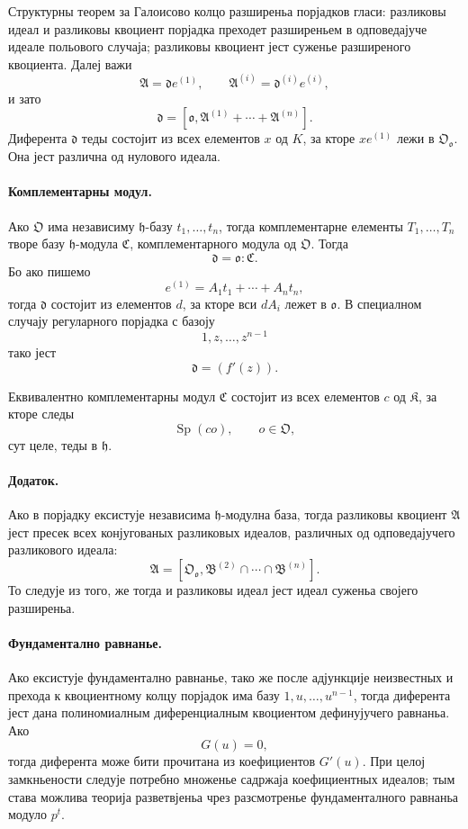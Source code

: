 ﻿\documentclass[11pt]{article}
\begin{document}
Структурны теорем за Галоисово колцо разширеньа порјадков гласи: разликовы идеал и разликовы квоциент порјадка преходет разширеньем в одповедајуче идеале польового случаја; разликовы квоциент јест суженье разширеного квоциента. Далеј важи
\[
        \mathfrak A=\mathfrak d e^{(1)},
        \qquad
        \mathfrak A^{(i)}=\mathfrak d^{(i)}e^{(i)},
\]
и зато
\[
        \mathfrak d=[\mathfrak o,\mathfrak A^{(1)}+
        \cdots+\mathfrak A^{(n)}].
\]
Диферента \(\mathfrak d\) теды состојит из всех елементов \(x\) од \(K\), за кторе \(xe^{(1)}\) лежи в \(\mathfrak O_{\mathfrak o}\). Она јест различна од нулового идеала.

\paragraph{Комплементарны модул.}
Ако \(\mathfrak O\) има независиму \(\mathfrak h\)-базу \(t_1,\ldots,t_n\), тогда комплементарне елементы \(T_1,\ldots,T_n\) творе базу \(\mathfrak h\)-модула \(\mathfrak C\), комплементарного модула од \(\mathfrak O\). Тогда
\[
        \mathfrak d=\mathfrak o:\mathfrak C.
\]
Бо ако пишемо
\[
        e^{(1)}=A_1t_1+
        \cdots+A_nt_n,
\]
тогда \(\mathfrak d\) состојит из елементов \(d\), за кторе вси \(dA_i\) лежет в \(\mathfrak o\). В специалном случају регуларного порјадка с базоју
\[
        1,z,\ldots,z^{n-1}
\]
тако јест
\[
        \mathfrak d=(f'(z)).
\]

Еквивалентно комплементарны модул \(\mathfrak C\) состојит из всех елементов \(c\) од \(\mathfrak K\), за кторе следы
\[
        \operatorname{Sp}(co),\qquad o\in\mathfrak O,
\]
сут целе, теды в \(\mathfrak h\).

\paragraph{Додаток.}
Ако в порјадку ексистује независима \(\mathfrak h\)-модулна база, тогда разликовы квоциент \(\mathfrak A\) јест пресек всех конјугованых разликовых идеалов, различных од одповедајучего разликового идеала:
\[
        \mathfrak A=[\mathfrak O_{\mathfrak o},
        \mathfrak B^{(2)}\cap\cdots\cap\mathfrak B^{(n)}].
\]
То следује из того, же тогда и разликовы идеал јест идеал суженьа својего разширеньа.

\paragraph{Фундаментално равнанье.}
Ако ексистује фундаментално равнанье, тако же после адјункције неизвестных и прехода к квоциентному колцу порјадок има базу \(1,u,\ldots,u^{n-1}\), тогда диферента јест дана полиномиалным диференциалным квоциентом дефинујучего равнаньа. Ако
\[
        G(u)=0,
\]
тогда диферента може бити прочитана из коефициентов \(G'(u)\). При целој замкньености следује потребно множенье садржаја коефициентных идеалов; тым става можлива теорија разветвјеньа чрез разсмотренье фундаменталного равнаньа модуло \(p^t\).
\end{document}
